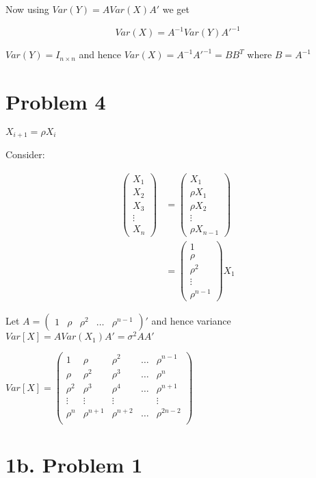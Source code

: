 \documentclass[a4paper]{article}
\begin{document}
Now using $Var(Y) = AVar(X)A'$ we get 

$$Var(X) = A^{-1}Var(Y)A'^{-1}$$

$Var(Y) = I_{n\times n}$
and hence $Var(X) = A^{-1}A'^{-1} = BB^T$ where $B=A^{-1}$

\newpage 
\section*{Problem 4}

$X_{i+1} = \rho X_i$

Consider:

\begin{align*}
\begin{pmatrix}
X_1\\
X_2\\
X_3\\
\vdots\\
X_n
\end{pmatrix} &= \begin{pmatrix}
X_1\\
\rho X_1\\
\rho X_2\\
\vdots\\
\rho X_{n-1}
\end{pmatrix}\\
&= \begin{pmatrix}
1\\
\rho\\
\rho^2\\
\vdots\\
\rho^{n-1}
\end{pmatrix}X_1
\end{align*}

Let $A=\begin{pmatrix}1 & \rho & \rho^2 & \dots & \rho^{n-1}\end{pmatrix}'$
and hence variance $Var[X] = AVar(X_1)A' = \sigma^2AA'$

$Var[X] = \begin{pmatrix}
1 & \rho & \rho^2 & \dots & \rho^{n-1}\\
\rho & \rho^2 & \rho^3 & \dots & \rho^n\\
\rho^2 & \rho^3 & \rho^4 & \dots & \rho^{n+1}\\
\vdots & \vdots & \vdots & & \vdots\\
\rho^n & \rho^{n+1} & \rho^{n+2} & \dots & \rho^{2n-2}\\
\end{pmatrix}$

\section*{1b. Problem 1}
\end{document}
